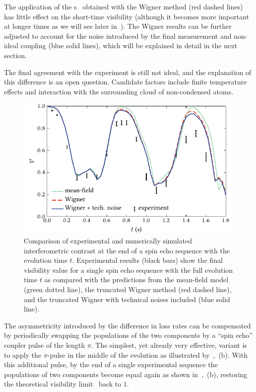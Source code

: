 The application of the s~ obtained with the Wigner method (red dashed lines) has little effect on the short-time visibility (although it becomes more important at longer times as we will see later in~).
The Wigner results can be further adjusted to account for the noise introduced by the final measurement and non-ideal coupling (blue solid lines), which will be explained in detail in the next section.

The final agreement with the experiment is still not ideal, and the explanation of this difference is an open question.
Candidate factors include finite temperature effects and interaction with the surrounding cloud of non-condensed atoms.

\begin{figure}
    \centerline{\includegraphics{figures_generated/bec_noise/echo_visibility_short.pdf}}

    \caption[Experimental and numerically simulated interferometric constrast in spin echo sequence]{
    Comparison of experimental and numerically simulated interferometric contrast at the end of a spin echo sequence with the evolution time $t$.
    Experimental results (black bars) show the final visibility value for a single spin echo sequence with the full evolution time $t$ as compared with the predictions from the mean-field model (green dotted line), the truncated Wigner method (red dashed line), and the truncated Wigner with technical noises included (blue solid line).}%

    \label{fig:bec-noise:visibility:echo-visibility}
\end{figure}

The asymmetricity introduced by the difference in loss rates can be compensated by periodically swapping the populations of the two components by a ``spin echo'' coupler pulse of the length $\pi$.
The simplest, yet already very effective, variant is to apply the $\pi$-pulse in the middle of the evolution as illustrated by~,~(b).
With this additional pulse, by the end of a single experimental sequence the populations of two components become equal again as shown in~,~(b), restoring the theoretical visibility limit~ back to $1$.

